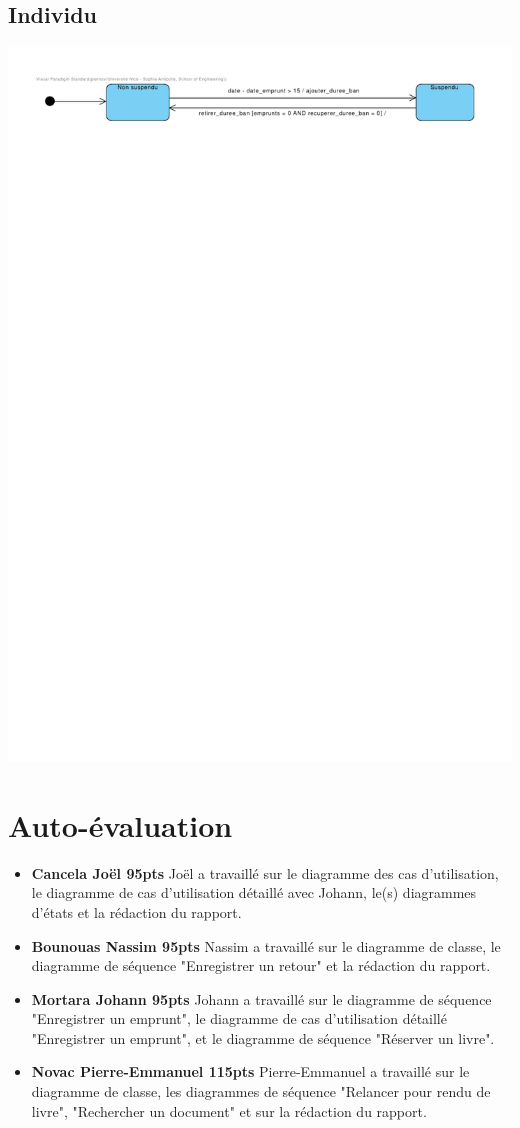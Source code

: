 \documentclass{article}
\begin{document}
\subsection{Individu}
\vspace{-4em}
\hspace*{-9em}\includegraphics[scale=1.5]{state_individu}
\vspace*{-4em}

\section{Auto-évaluation}
\begin{itemize}
	\item \textbf{Cancela Joël 95pts}
		Joël a travaillé sur le diagramme des cas d'utilisation, le diagramme de cas d'utilisation détaillé avec Johann, le(s) diagrammes d'états et la rédaction du rapport.
	\item \textbf{Bounouas Nassim 95pts}
		Nassim a travaillé sur le diagramme de classe, le diagramme de séquence "Enregistrer un retour" et la rédaction du rapport.
	\item \textbf{Mortara Johann 95pts}
		Johann a travaillé sur le diagramme de séquence "Enregistrer un emprunt", le diagramme de cas d'utilisation détaillé "Enregistrer un emprunt", et le diagramme de séquence "Réserver un livre".
	\item \textbf{Novac Pierre-Emmanuel 115pts}
		Pierre-Emmanuel a travaillé sur le diagramme de classe, les diagrammes de séquence "Relancer pour rendu de livre", "Rechercher un document" et sur la rédaction du rapport.
\end{itemize}
\end{document}
